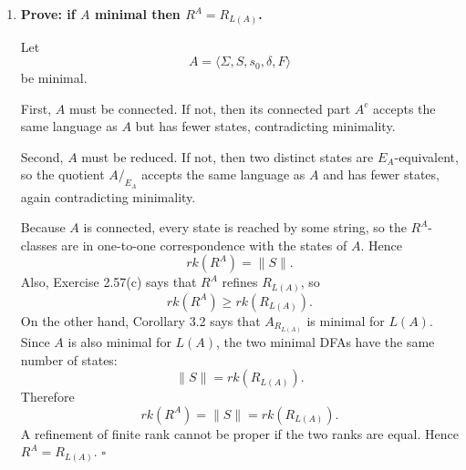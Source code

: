 \begin{enumerate}[{3.}1.]
\begin{enumerate}
\item Isomorphism $\psi: A_{R^M}\to M$: Not always. Only if $M$ is connected (since $A_{R^M}\cong M^c$, isomorphism only if $M=M^c$, i.e., $M$ connected).

\item Homomorphism $\psi: M\to A_{R^M}$: Not always. The reachable part of $M$ maps naturally to $A_{R^M}$ (send each reachable state $s$ to $[ x_s ]_{R^M}$ where $x_s$ is any string reaching $s$), but unreachable states may obstruct extension.

\textbf{Counterexample.} Let $\Sigma=\{\mathbf{a}\}$, $S=\{s_0,s_1,s_{d}\}$, $s_0$ initial, $F=\{s_1\}$, with
\[
  \delta(s_0,\mathbf{a})=s_1,\quad \delta(s_1,\mathbf{a})=s_1,\quad \delta(s_d,\mathbf{a})=s_0.
\]
State $s_d$ is unreachable. The accessible quotient $A_{R^M}$ has two states $q_0,q_1$ with
\[
  \delta'(q_0,\mathbf{a})=q_1,\quad \delta'(q_1,\mathbf{a})=q_1,
\]
$q_0$ initial, $F'=\{q_1\}$.

A homomorphism $\psi:M\to A_{R^M}$ must satisfy $\psi(s_0)=q_0$ (initial states correspond) and $\delta'(\psi(s),\mathbf{a})=\psi(\delta(s,\mathbf{a}))$ for every $s$.
From $s_d$: $\delta'(\psi(s_d),\mathbf{a})=\psi(\delta(s_d,\mathbf{a}))=\psi(s_0)=q_0$.
But $\delta'(q_0,\mathbf{a})=q_1\neq q_0$ and $\delta'(q_1,\mathbf{a})=q_1\neq q_0$, so no state in $A_{R^M}$ can serve as $\psi(s_d)$. The homomorphism does not exist. $\square$
\end{enumerate}

\item \textbf{Prove: if $A$ minimal then $R^A=R_{L(A)}$.}

Let
\[
A=\langle\Sigma,S,s_0,\delta,F\rangle
\]
be minimal.

First, $A$ must be connected. If not, then its connected part $A^c$ accepts the
same language as $A$ but has fewer states, contradicting minimality.

Second, $A$ must be reduced. If not, then two distinct states are $E_A$-equivalent,
so the quotient $A/_{E_A}$ accepts the same language as $A$ and has fewer states,
again contradicting minimality.

Because $A$ is connected, every state is reached by some string, so the
$R^A$-classes are in one-to-one correspondence with the states of $A$. Hence
\[
rk(R^A)=\|S\|.
\]
Also, Exercise 2.57(c) says that $R^A$ refines $R_{L(A)}$, so
\[
rk(R^A)\geq rk(R_{L(A)}).
\]
On the other hand, Corollary 3.2 says that $A_{R_{L(A)}}$ is minimal for
$L(A)$. Since $A$ is also minimal for $L(A)$, the two minimal DFAs have the same
number of states:
\[
\|S\|=rk(R_{L(A)}).
\]
Therefore
\[
rk(R^A)=\|S\|=rk(R_{L(A)}).
\]
A refinement of finite rank cannot be proper if the two ranks are equal. Hence
$R^A=R_{L(A)}$. $\square$


\end{enumerate}
